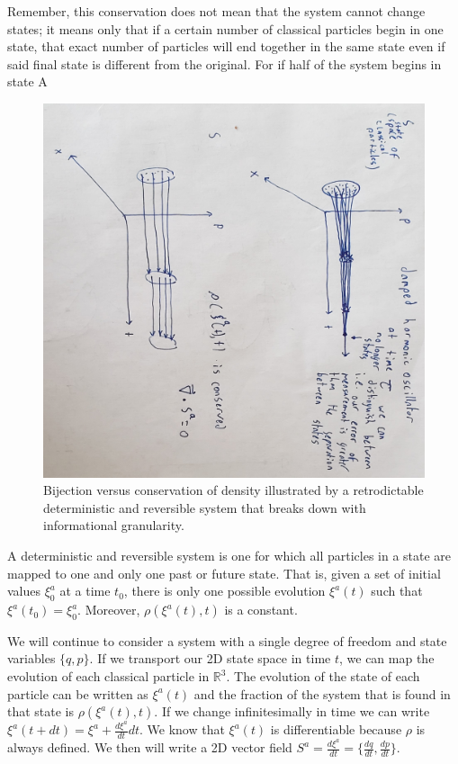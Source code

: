\documentclass{article}
\begin{document}
	Remember, this conservation does not mean that the system cannot change states; it means only that if a certain number of classical particles begin in one state, that exact number of particles will end together in the same state even if said final state is different from the original. For if half of the system begins in state A 
	
\begin{figure}[!ht]
\centerline{\includegraphics[width=\textwidth,angle=90,scale=.6]{streamfunctiondiagram.jpg}}
\caption{Bijection versus conservation of density illustrated by a retrodictable deterministic and reversible system that breaks down with informational granularity.}
\end{figure}

\begin{defn}
	A deterministic and reversible system is one for which all particles in a state are mapped to one and only one past or future state. That is, given a set of initial values $\xi^a_0$ at a time $t_0$, there is only one possible evolution $\xi^a(t)$ such that $\xi^a(t_0) = \xi^a_0$. Moreover, $\rho(\xi^a(t), t)$ is a constant.
\end{defn}

	We will continue to consider a system with a single degree of freedom and state variables $\{q,p \}$. If we transport our 2D state space in time $t$, we can map the evolution of each classical particle in $\mathbb{R}^3$. The evolution of the state of each particle can be written as $\xi^a(t)$ and the fraction of the system that is found in that state is $\rho(\xi^a(t), t)$. If we change infinitesimally in time we can write $\xi^a(t + dt) = \xi^a + \frac{d\xi^a}{dt}dt$. We know that $\xi^a(t)$ is differentiable because $\rho$ is always defined. We then will write a 2D vector field $S^a =\frac{d\xi^a}{dt} = \{\frac{dq}{dt},\frac{dp}{dt} \}$.
	
\end{document}
